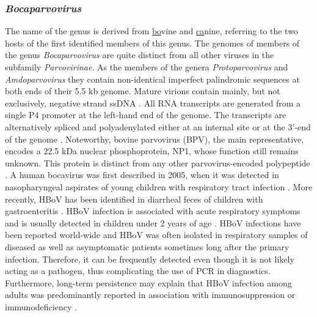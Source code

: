 \subsubsection{\textit{Bocaparvovirus}}
The name of the genus is derived from \underline{bo}vine and \underline{ca}nine, referring to the two hosts of the first identified members of this genus.  The genomes of members of the genus \textit{Bocaparvovirus} are quite distinct from all other viruses in the subfamily \textit{Parvovirinae}. As the members of the genera \textit{Protoparvovirus} and \textit{Amdoparvovirus} they contain non-identical imperfect palindromic sequences at both ends of their 5.5 kb genome. Mature virions contain mainly, but not exclusively, negative strand ssDNA \cite{pmid3783814,pmid12441065}.
All RNA transcripts are generated from a single P4 promoter at the left-hand end of the genome. The transcripts are alternatively spliced and polyadenylated either at an internal site or at the 3’-end of the genome \cite{pmid17715221}. Noteworthy, bovine parvovirus (BPV), the main representative, encodes a 22.5 kDa nuclear phosphoprotein, NP1, whose function still remains unknown. This protein is distinct from any other parvovirus-encoded polypeptide \cite{pmid6319731}.
A human bocavirus was first described in 2005, when it was detected in nasopharyngeal aspirates of young children with respiratory tract infection \cite{pmid11562506, pmid16118271}. More recently, HBoV has been identified in diarrheal feces of children with gastroenteritis \cite{pmid17553287}. HBoV infection is associated with acute respiratory symptoms and is usually detected in children under 2 years of age \cite{pmid17122013, pmid16517912, pmid17041855}. HBoV infections have been reported world-wide and HBoV was often isolated in respiratory samples of diseased as well as asymptomatic patients sometimes long after the primary infection. Therefore, it can be frequently detected even though it is not likely acting as a pathogen, thus complicating the use of PCR in diagnostics. Furthermore, long-term persistence may explain that HBoV infection among adults was predominantly reported in association with immunosuppression or immunodeficiency \cite{pmid17041855, pmid17176591}.         





